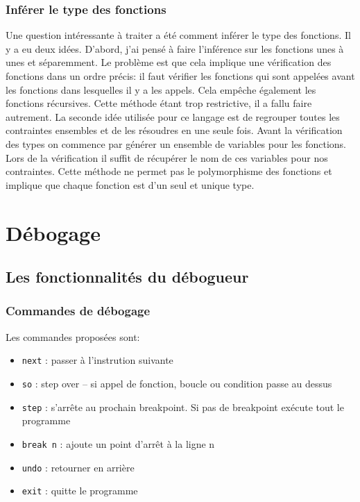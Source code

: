 \documentclass{article}
\begin{document}
\subsubsection{Inférer le type des fonctions}
Une question intéressante à traiter a été comment inférer le type des 
fonctions. Il y a eu deux idées. D'abord, j'ai pensé à faire l'inférence 
sur les fonctions unes à unes et séparemment. Le problème est que cela 
implique une vérification des fonctions dans un ordre précis: il faut 
vérifier les fonctions qui sont appelées avant les fonctions dans 
lesquelles il y a les appels. Cela empêche également les fonctions 
récursives. Cette méthode étant trop restrictive, il a fallu faire 
autrement. La seconde idée utilisée pour ce langage est de regrouper 
toutes les contraintes ensembles et de les résoudres en une seule fois.
Avant la vérification des types on commence par générer un ensemble de 
variables pour les fonctions. Lors de la vérification il suffit de récupérer 
le nom de ces variables pour nos contraintes. Cette méthode ne permet pas le 
polymorphisme des fonctions et implique que chaque fonction est d'un seul 
et unique type.

\section{Débogage}

\subsection{Les fonctionnalités du débogueur}

\subsubsection{Commandes de débogage}
Les commandes proposées sont:
\begin{itemize}
    \item \texttt{next} : passer à l'instrution suivante
    \item \texttt{so}   : step over -- si appel de fonction, boucle ou condition passe au dessus
    \item \texttt{step} : s'arrête au prochain breakpoint. Si pas de breakpoint exécute tout le programme
    \item \texttt{break n} : ajoute un point d'arrêt à la ligne n
    \item \texttt{undo} : retourner en arrière
    \item \texttt{exit} : quitte le programme
\end{itemize}
\end{document}
